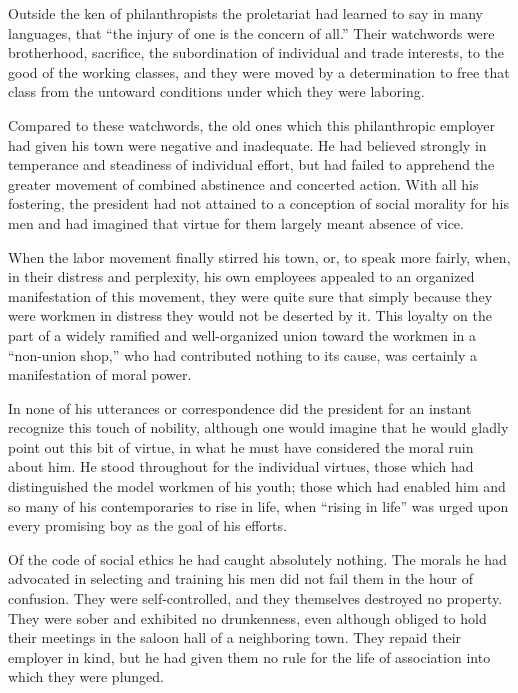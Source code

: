 \documentclass[]{article}
\begin{document}
\begin{sectionbody}
\addamsparagraph Outside the ken of philanthropists the proletariat had learned to say in
many languages, that ``the injury of one is the concern of all.'' Their
watchwords were brotherhood, sacrifice, the subordination of individual
and trade interests, to the good of the working classes, and they were
moved by a determination to free that class from the untoward conditions
under which they were laboring.

\addamsparagraph Compared to these watchwords, the old ones which this philanthropic
employer had given his town were negative and inadequate. He had
believed strongly in temperance and steadiness of individual effort, but
had failed to apprehend the greater movement of combined abstinence and
concerted action. With all his fostering, the president had not attained
to a conception of social morality for his men and had imagined that
virtue for them largely meant absence of vice.

\addamsparagraph When the labor movement finally stirred his town, or, to speak more
fairly, when, in their distress and perplexity, his own employees
appealed to an organized manifestation of this movement, they were quite
sure that simply because they were workmen in distress they would not be
deserted by it. This loyalty on the part of a widely ramified and
well-organized union toward the workmen in a ``non-union shop,'' who had
contributed nothing to its cause, was certainly a manifestation of moral
power.

\addamsparagraph In none of his utterances or correspondence did the president for an
instant recognize this touch of nobility, although one would imagine
that he would gladly point out this bit of virtue, in what he must have
considered the moral ruin about him. He stood throughout for the
individual virtues, those which had distinguished the model workmen of
his youth; those which had enabled him and so many of his
contemporaries to rise in life, when ``rising in life'' was urged upon
every promising boy as the goal of his efforts.

\addamsparagraph Of the code of social ethics he had caught absolutely nothing. The
morals he had advocated in selecting and training his men did not fail
them in the hour of confusion. They were self-controlled, and they
themselves destroyed no property. They were sober and exhibited no
drunkenness, even although obliged to hold their meetings in the saloon
hall of a neighboring town. They repaid their employer in kind, but he
had given them no rule for the life of association into which they were
plunged.


\end{sectionbody}
\end{document}
